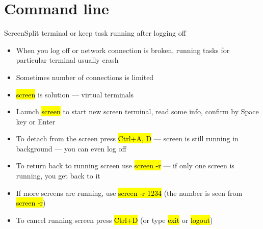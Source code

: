 \documentclass[compress, ucs, xelatex, 11pt, xcolor=svgnames,
  hyperref={
    bookmarks=true,
    unicode=true,
    colorlinks=true,
    pdftitle={Linux, command line and MetaCentrum},
    plainpages=false,
    pdfauthor={Vojtech Zeisek},
    pdfsubject={Course about use of Linux command line, writing shell scripts and using MetaCentrum of CESNET},
    pdfcreator={XeLaTeX, http://www.xelatex.org/},
    pdfkeywords={Linux, GNU, BASH, shell, command line, MetaCentrum},
    linkcolor=Sienna,
    anchorcolor=black,
    citecolor=green,
    filecolor=magenta,
    menucolor=Sienna,
    urlcolor=cyan,
    pdftex},
  url={hyphens, lowtilde} %
  ]{beamer}
\renewcommand{\texttt}[1]{\hl{\ttfamily #1}}
\begin{document}
\section{Command line}

\begin{frame}{Screen}{Split terminal or keep task running after logging off}
\begin{itemize}
  \item When you log off or network connection is broken, running tasks for particular terminal usually crash
  \item Sometimes number of connections is limited
  \item \texttt{screen} is solution --- virtual terminals
  \item Launch \texttt{screen} to start new screen terminal, read some info, confirm by Space key or Enter
  \item To detach from the screen press \texttt{Ctrl+A, D} --- screen is still running in background --- you can even log off
  \item To return back to running screen use \texttt{screen -r} --- if only one screen is running, you get back to it
  \item If more screens are running, use \texttt{screen -r 1234} (the number is seen from \texttt{screen -r})
  \item To cancel running screen press \texttt{Ctrl+D} (or type \texttt{exit} or \texttt{logout})
\end{itemize}
\end{frame}
\end{document}
